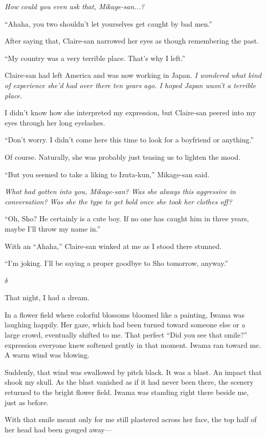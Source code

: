 \documentclass[
    a4paper,
    12pt,
    twoside,
    openany,
    UTF8,
    fontset=windows
]{ctexbook}
\begin{document}
\textit{How could you even ask that, Mikage-san...?}

``Ahaha, you two shouldn't let yourselves get caught by bad men.''

After saying that, Claire-san narrowed her eyes as though remembering the past.

``My country was a very terrible place. That's why I left.''

Claire-san had left America and was now working in Japan. \textit{I wondered what kind of experience she'd had over there ten years ago. I hoped Japan wasn't a terrible place.}

I didn't know how she interpreted my expression, but Claire-san peered into my eyes through her long eyelashes.

``Don't worry. I didn't come here this time to look for a boyfriend or anything.''

Of course. Naturally, she was probably just teasing us to lighten the mood.

``But you seemed to take a liking to Izuta-kun,'' Mikage-san said.

\textit{What had gotten into you, Mikage-san? Was she always this aggressive in conversation? Was she the type to get bold once she took her clothes off?}

``Oh, Sho? He certainly is a cute boy. If no one has caught him in three years, maybe I'll throw my name in.''

With an ``Ahaha,'' Claire-san winked at me as I stood there stunned.

``I'm joking. I'll be saying a proper goodbye to Sho tomorrow, anyway.''

$\delta$

That night, I had a dream.

In a flower field where colorful blossoms bloomed like a painting, Iwama was laughing happily. Her gaze, which had been turned toward someone else or a large crowd, eventually shifted to me. That perfect ``Did you see that smile?'' expression everyone knew softened gently in that moment. Iwama ran toward me. A warm wind was blowing.

Suddenly, that wind was swallowed by pitch black. It was a blast. An impact that shook my skull. As the blast vanished as if it had never been there, the scenery returned to the bright flower field. Iwama was standing right there beside me, just as before.

With that smile meant only for me still plastered across her face, the top half of her head had been gouged away---
\end{document}

